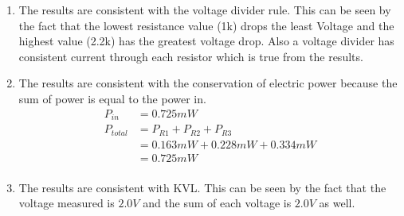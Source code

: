 {{{{{\begin{enumerate}
  This is reasonable value considering all the sources of error. Such as the
  Tolerance of the resistors.
  \begin{equation}
    \begin{aligned}
      R_{EQ} & = R_1+R_2+R_3 \\
      & = 1k + 1.5k + 2.2k \\
      & = 4.7 k \Omega \\
      Error &= 100\% \times \frac{R_{in} - R_{EQ}}{R_{EQ}}\\
      &=  100\% \times \frac{5.6 - 4.7}{4.7}\\
      &= 19.1\%\\
    \end{aligned}
  \end{equation}
  \item The results are consistent with the voltage divider rule. This can be
  seen by the fact that the lowest resistance value (1k) drops the least Voltage
  and the highest value (2.2k) has the greatest voltage drop. Also a voltage divider
  has consistent current through each resistor which is true from the results.
  \item The results are consistent with the conservation of electric power because
  the sum of power is equal to the power in.
  \begin{equation}
    \begin{aligned}
      P_{in} & = 0.725 mW\\
      P_{total} & = P_{R1}+P_{R2}+P_{R3} \\
      & = 0.163 mW + 0.228 mW + 0.334 mW \\
      & = 0.725 mW \\
    \end{aligned}
  \end{equation}
  \item The results are consistent with KVL. This can be seen by the fact that the
  voltage measured is $2.0 V$ and the sum of each voltage is $2.0 V$ as well.
\end{enumerate}

}}}}}
